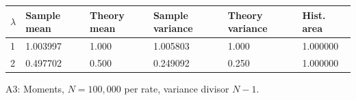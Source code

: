 \begin{center}
\small
\begin{tabular}{llllll}
\toprule
$\lambda$ & Sample mean & Theory mean & Sample variance & Theory variance & Hist. area\\
\midrule
1 & 1.003997 & 1.000 & 1.005803 & 1.000 & 1.000000\\
2 & 0.497702 & 0.500 & 0.249092 & 0.250 & 1.000000\\
\bottomrule
\end{tabular}
\par\smallskip A3: Moments, $N=100{,}000$ per rate, variance divisor $N-1$.
\end{center}